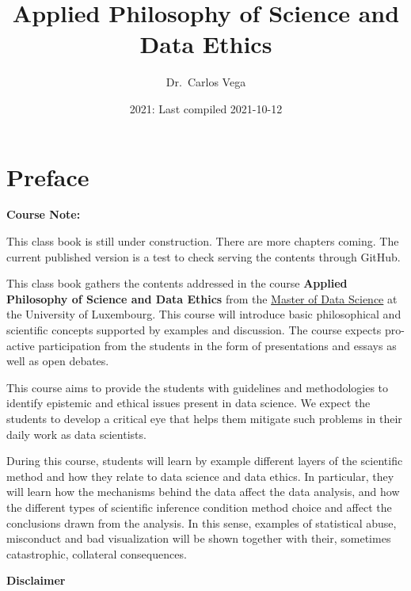 \documentclass[
]{book}
\title{Applied Philosophy of Science and Data Ethics}
\author{Dr.~Carlos Vega}
\date{2021: Last compiled 2021-10-12}
\begin{document}
\maketitle

{
\hypersetup{linkcolor=}
\setcounter{tocdepth}{3}
\tableofcontents
}
\hypertarget{preface}{%
\chapter*{Preface}\label{preface}}

\begin{notebox}

\begin{center}
\textbf{Course Note:}

\end{center}

This class book is still under construction. There are more chapters coming. The current published version is a test to check serving the contents through GitHub.

\end{notebox}

This class book gathers the contents addressed in the course \textbf{Applied Philosophy of Science and Data Ethics} from the \href{https://wwwfr.uni.lu/formations/fstm/master_of_data_science}{Master of Data Science} at the University of Luxembourg. This course will introduce basic philosophical and scientific concepts supported by examples and discussion. The course expects pro-active participation from the students in the form of presentations and essays as well as open debates.

This course aims to provide the students with guidelines and methodologies to identify epistemic and ethical issues present in data science. We expect the students to develop a critical eye that helps them mitigate such problems in their daily work as data scientists.

During this course, students will learn by example different layers of the scientific method and how they relate to data science and data ethics. In particular, they will learn how the mechanisms behind the data affect the data analysis, and how the different types of scientific inference condition method choice and affect the conclusions drawn from the analysis. In this sense, examples of statistical abuse, misconduct and bad visualization will be shown together with their, sometimes catastrophic, collateral consequences.

\textbf{Disclaimer}
\end{document}
